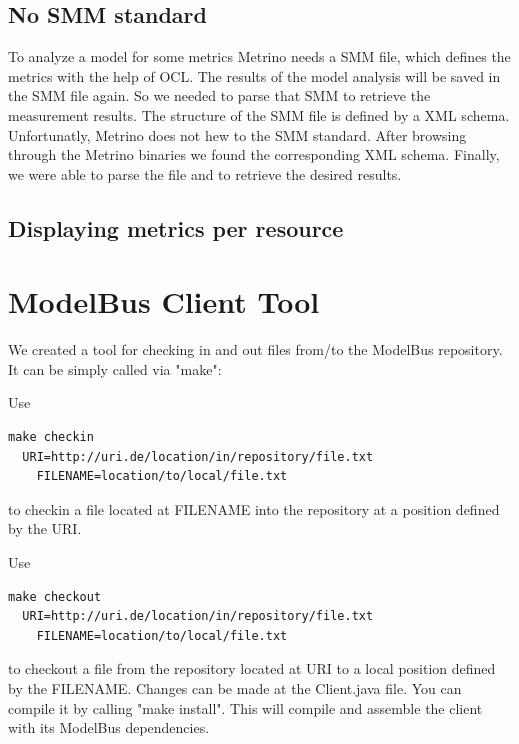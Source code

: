 \subsection{No SMM standard}
To analyze a model for some metrics Metrino needs a SMM file, which
defines the metrics with the help of OCL. The results of the model
analysis will be saved in the SMM file again. So we needed to parse
that SMM to retrieve the measurement results. The structure of the SMM
file is defined by a XML schema. Unfortunatly, Metrino does not hew to
the SMM standard. After browsing through the Metrino binaries we found
the corresponding XML schema. Finally, we were able to parse the file
and to retrieve the desired results.

\subsection{Displaying metrics per resource}









\section{ModelBus Client Tool}
We created a tool for checking in and out files from/to the ModelBus repository. It can be simply called via "make":

Use
\begin{verbatim}
make checkin 
  URI=http://uri.de/location/in/repository/file.txt 
	FILENAME=location/to/local/file.txt
\end{verbatim}
to checkin a file located at FILENAME into the repository at a position defined by the URI.

Use
\begin{verbatim}
make checkout 
  URI=http://uri.de/location/in/repository/file.txt 
	FILENAME=location/to/local/file.txt
\end{verbatim}
to checkout a file from the repository located at URI to a local position defined by the FILENAME.
Changes can be made at the Client.java file. You can compile it by calling "make install". This will compile and assemble the client with its ModelBus dependencies.
